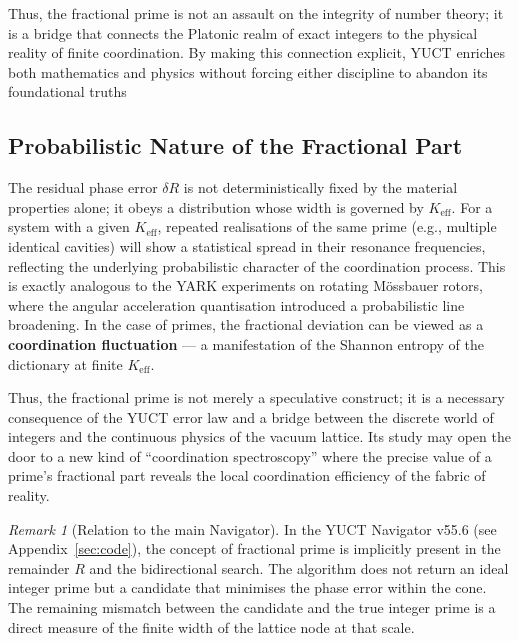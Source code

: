 \documentclass[12pt,a4paper]{article}
\theoremstyle{remark}
\newtheorem{remark}[theorem]{Remark}
\begin{document}
Thus, the fractional prime is not an assault on the integrity of number theory; it is a bridge that connects the Platonic realm of exact integers to the physical reality of finite coordination. By making this connection explicit, YUCT enriches both mathematics and physics without forcing either discipline to abandon its foundational truths

	\subsection{Probabilistic Nature of the Fractional Part}
	
	The residual phase error \(\delta R\) is not deterministically fixed by the material properties alone; it obeys a distribution whose width is governed by \(K_{\mathrm{eff}}\). For a system with a given \(K_{\mathrm{eff}}\), repeated realisations of the same prime (e.g., multiple identical cavities) will show a statistical spread in their resonance frequencies, reflecting the underlying probabilistic character of the coordination process. This is exactly analogous to the YARK experiments on rotating Mössbauer rotors, where the angular acceleration quantisation introduced a probabilistic line broadening. In the case of primes, the fractional deviation can be viewed as a \textbf{coordination fluctuation} — a manifestation of the Shannon entropy of the dictionary at finite \(K_{\mathrm{eff}}\).
	
	Thus, the fractional prime is not merely a speculative construct; it is a necessary consequence of the YUCT error law and a bridge between the discrete world of integers and the continuous physics of the vacuum lattice. Its study may open the door to a new kind of “coordination spectroscopy” where the precise value of a prime’s fractional part reveals the local coordination efficiency of the fabric of reality.
	
	\begin{remark}[Relation to the main Navigator]
		In the YUCT Navigator v55.6 (see Appendix~\ref{sec:code}), the concept of fractional prime is implicitly present in the remainder \(R\) and the bidirectional search. The algorithm does not return an ideal integer prime but a candidate that minimises the phase error within the cone. The remaining mismatch between the candidate and the true integer prime is a direct measure of the finite width of the lattice node at that scale.
	\end{remark}
	
	
\end{document}
